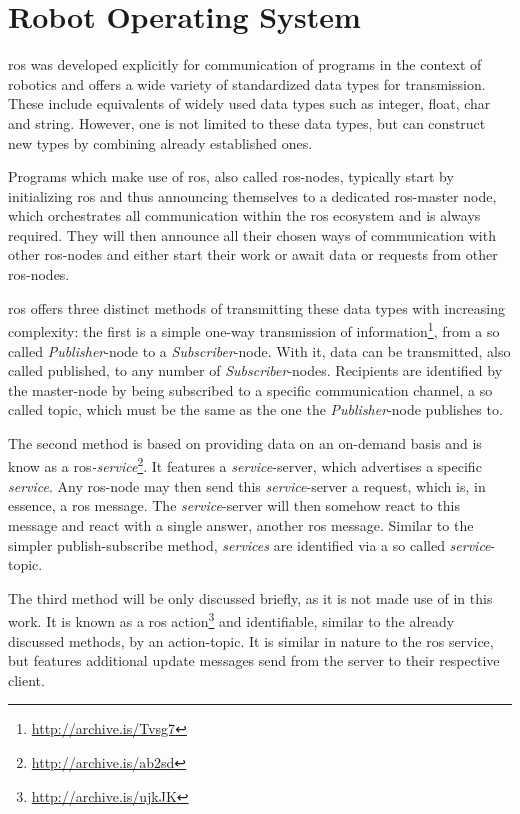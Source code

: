 \section{Robot Operating System}
\label{intro:ros}
\gls{ros} \cite{288} was developed explicitly for communication of programs in the context of robotics and offers a wide variety of standardized data types for transmission.
These include equivalents of widely used data types such as integer, float, char and string.
However, one is not limited to these data types, but can construct new types by combining already established ones.

Programs which make use of \gls{ros}, also called \gls{ros}-nodes, typically start by initializing \gls{ros} and thus announcing themselves to a dedicated \gls{ros}-master node, which orchestrates all communication within the \gls{ros} ecosystem and is always required.
They will then announce all their chosen ways of communication with other \gls{ros}-nodes and either start their work or await data or requests from other \gls{ros}-nodes.

\gls{ros} offers three distinct methods of transmitting these data types with increasing complexity:
the first is a simple one-way transmission of information\footnote{\url{http://archive.is/Tvsg7}}, from a so called \textit{Publisher}-node to a \textit{Subscriber}-node.
With it, data can be transmitted, also called published, to any number of \textit{Subscriber}-nodes.
Recipients are identified by the master-node by being subscribed to a specific communication channel, a so called topic, which must be the same as the one the \textit{Publisher}-node publishes to.

The second method is based on providing data on an on-demand basis and is know as a \gls{ros}\textit{-service}\footnote{\url{http://archive.is/ab2sd}}.
It features a \textit{service}-server, which advertises a specific \textit{service}.
Any \gls{ros}-node may then send this \textit{service}-server a request, which is, in essence, a \gls{ros} message.
The \textit{service}-server will then somehow react to this message and react with a single answer, another \gls{ros} message.
Similar to the simpler publish-subscribe method, \textit{services} are identified via a so called \textit{service}-topic.

The third method will be only discussed briefly, as it is not made use of in this work.
It is known as a \gls{ros} action\footnote{\url{http://archive.is/ujkJK}} and identifiable, similar to the already discussed methods, by an action-topic.
It is similar in nature to the \gls{ros} service, but features additional update messages send from the server to their respective client.

